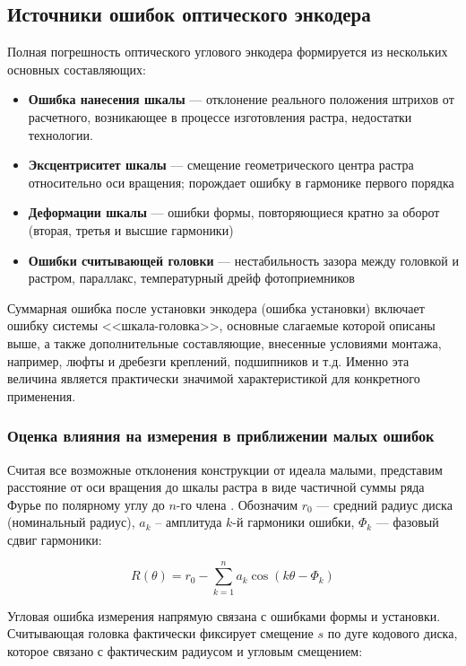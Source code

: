 \subsection{Источники ошибок оптического энкодера}

Полная погрешность оптического углового энкодера формируется из нескольких основных составляющих:

\begin{itemize}
\item \textbf{Ошибка нанесения шкалы} --- отклонение реального положения штрихов от расчетного, возникающее в процессе изготовления растра, недостатки технологии.
\item \textbf{Эксцентриситет шкалы} --- смещение геометрического центра растра относительно оси вращения; порождает ошибку в гармонике первого порядка
\item \textbf{Деформации шкалы} --- ошибки формы, повторяющиеся кратно за оборот (вторая, третья и высшие гармоники)
\item \textbf{Ошибки считывающей головки} --- нестабильность зазора между головкой и растром, параллакс, температурный дрейф фотоприемников
\end{itemize}

Суммарная ошибка после установки энкодера (ошибка установки) включает ошибку системы <<шкала-головка>>, основные слагаемые которой описаны выше, а также дополнительные составляющие, внесенные условиями монтажа, например, люфты и дребезги креплений, подшипников и т.д. Именно эта величина является практически значимой характеристикой для конкретного применения.

\subsubsection{Оценка влияния на измерения в приближении малых ошибок}

Считая все возможные отклонения конструкции от идеала малыми, представим расстояние от оси вращения до шкалы растра в виде частичной суммы ряда Фурье по полярному углу до $n$-го члена \cite{renishaw_encoder_accuracy}. Обозначим $r_0$ --- средний радиус диска (номинальный радиус), $a_k$ -- амплитуда $k$-й гармоники ошибки, $\Phi_k$ --- фазовый сдвиг гармоники:

\begin{equation*}
    R(\theta) = r_0 - \sum_{k=1}^{n}a_k\cos(k\theta-\Phi_k)
\end{equation*}

Угловая ошибка измерения напрямую связана с ошибками формы и установки. Считывающая головка фактически фиксирует смещение $s$ по дуге кодового диска, которое связано с фактическим радиусом и угловым смещением:

